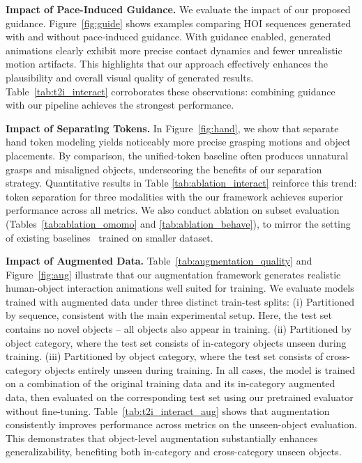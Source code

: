 \noindent\textbf{Impact of Pace-Induced Guidance.}
We evaluate the impact of our proposed guidance. Figure~\ref{fig:guide} shows examples comparing HOI sequences generated with and without pace-induced guidance. With guidance enabled, generated animations clearly exhibit more precise contact dynamics and fewer unrealistic motion artifacts. This highlights that our approach effectively enhances the plausibility and overall visual quality of generated results. Table~\ref{tab:t2i_interact} corroborates these observations: combining guidance with our pipeline achieves the strongest performance.


\noindent\textbf{Impact of Separating Tokens.} In Figure~\ref{fig:hand}, we show that separate hand token modeling yields noticeably more precise grasping motions and object placements. By comparison, the unified-token baseline often produces unnatural grasps and misaligned objects, underscoring the benefits of our separation strategy. Quantitative results in Table \ref{tab:ablation_interact} reinforce this trend: token separation for three modalities with the our framework achieves superior performance across all metrics. We also conduct ablation on subset evaluation (Tables~\ref{tab:ablation_omomo} and \ref{tab:ablation_behave}), to mirror the setting of existing baselines~\citep{li2023controllable,xu2023interdiff,peng2023hoi} trained on smaller dataset.

\noindent\textbf{Impact of Augmented Data.}
Table~\ref{tab:augmentation_quality} and Figure~\ref{fig:aug} illustrate that our augmentation framework generates realistic human-object interaction animations well suited for training.
We evaluate models trained with augmented data under three distinct train-test splits:
(i) Partitioned by sequence, consistent with the main experimental setup. Here, the test set contains no novel objects -- all objects also appear in training.
(ii) Partitioned by object category, where the test set consists of in-category objects unseen during training.
(iii) Partitioned by object category, where the test set consists of cross-category objects entirely unseen during training.
In all cases, the model is trained on a combination of the original training data and its in-category augmented data, then evaluated on the corresponding test set using our pretrained evaluator without fine-tuning.
Table~\ref{tab:t2i_interact_aug} shows that augmentation consistently improves performance across metrics on the unseen-object evaluation. This demonstrates that object-level augmentation substantially enhances generalizability, benefiting both in-category and cross-category unseen objects. 



